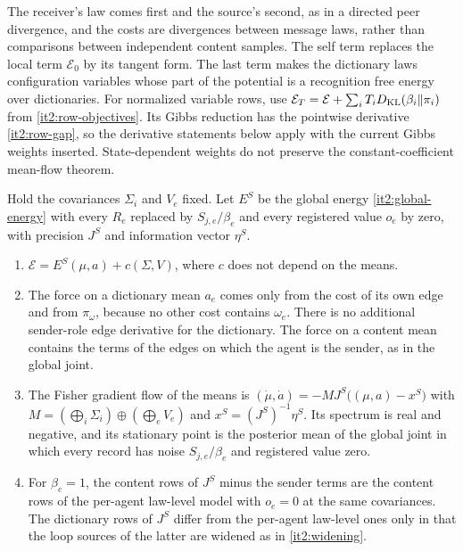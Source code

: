 The receiver's law comes first and the source's second, as in a directed peer divergence, and the costs are divergences between message laws, rather than comparisons between independent content samples. The self term replaces the local term $\mathcal E_0$ by its tangent form. The last term makes the dictionary laws configuration variables whose part of the potential is a recognition free energy over dictionaries. For normalized variable rows, use $\mathcal E_T=\mathcal E+\sum_iT_iD_{\mathrm{KL}}(\beta_i\Vert\pi_i)$ from \cref{it2:row-objectives}. Its Gibbs reduction has the pointwise derivative \cref{it2:row-gap}, so the derivative statements below apply with the current Gibbs weights inserted. State-dependent weights do not preserve the constant-coefficient mean-flow theorem.

Hold the covariances $\Sigma_i$ and $V_e$ fixed. Let $E^S$ be the global energy \cref{it2:global-energy} with every $R_e$ replaced by $S_{j,e}/\beta_e$ and every registered value $o_e$ by zero, with precision $J^S$ and information vector $\eta^S$.
\begin{enumerate}
\item[(i)] $\mathcal E=E^S(\mu,a)+c(\Sigma,V)$, where $c$ does not depend on the means.
\item[(ii)] The force on a dictionary mean $a_e$ comes only from the cost of its own edge and from $\pi_\omega$, because no other cost contains $\omega_e$. There is no additional sender-role edge derivative for the dictionary. The force on a content mean contains the terms of the edges on which the agent is the sender, as in the global joint.
\item[(iii)] The Fisher gradient flow of the means is $(\dot\mu,\dot a)=-MJ^S\bigl((\mu,a)-x^S\bigr)$ with $M=(\bigoplus_i\Sigma_i)\oplus(\bigoplus_eV_e)$ and $x^S=(J^S)^{-1}\eta^S$. Its spectrum is real and negative, and its stationary point is the posterior mean of the global joint in which every record has noise $S_{j,e}/\beta_e$ and registered value zero.
\item[(iv)] For $\beta_e=1$, the content rows of $J^S$ minus the sender terms are the content rows of the per-agent law-level model with $o_e=0$ at the same covariances. The dictionary rows of $J^S$ differ from the per-agent law-level ones only in that the loop sources of the latter are widened as in \cref{it2:widening}.
\end{enumerate}

